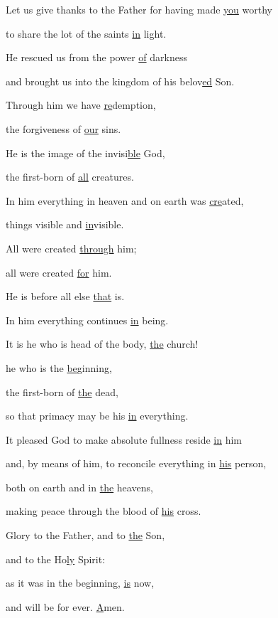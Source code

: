 \noindent Let us give thanks to the Father for having made \uline{you} worthy~\GreStar{}~\nopagebreak

to share the lot of the saints \uline{in} light.

\noindent He rescued us from the power \uline{of} darkness~\GreStar{}~\nopagebreak

and brought us into the kingdom of his belov\uline{ed} Son.

\noindent Through him we have \uline{re}demption,~\GreStar{}~\nopagebreak

the forgiveness of \uline{our} sins.

\noindent He is the image of the invisi\uline{ble} God,~\GreStar{}~\nopagebreak

the first-born of \uline{all} creatures.

\noindent In him everything in heaven and on earth was \uline{cre}ated,~\GreStar{}~\nopagebreak

things visible and \uline{in}visible.

\noindent All were created \uline{through} him;~\GreStar{}~\nopagebreak

all were created \uline{for} him.

\noindent He is before all else \uline{that} is.~\GreStar{}~\nopagebreak

In him everything continues \uline{in} being.

\noindent It is he who is head of the body, \uline{the} church!~\GreStar{}~\nopagebreak

he who is the \uline{be}ginning,

\noindent the first-born of \uline{the} dead,~\GreStar{}~\nopagebreak

so that primacy may be his \uline{in} everything.

\noindent It pleased God to make absolute fullness reside \uline{in} him~\GreStar{}~\nopagebreak

and, by means of him, to reconcile everything in \uline{his} person,

\noindent both on earth and in \uline{the} heavens,~\GreStar{}~\nopagebreak

making peace through the blood of \uline{his} cross.

\noindent Glory to the Father, and to \uline{the} Son,~\GreStar{}~\nopagebreak

and to the Ho\uline{ly} Spirit:

\noindent as it was in the beginning, \uline{is} now,~\GreStar{}~\nopagebreak

and will be for ever. \uline{A}men.
